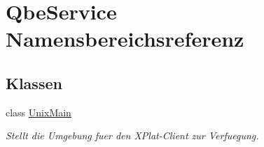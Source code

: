\hypertarget{namespaceQbeService}{
\section{Qbe\-Service Namensbereichsreferenz}
\label{namespaceQbeService}
}




\subsection*{Klassen}
\begin{CompactItemize}
\item 
class \hyperlink{classQbeService_1_1UnixMain}{Unix\-Main}
\begin{CompactList}\small\item\em Stellt die Umgebung fuer den XPlat-Client zur Verfuegung. \item\end{CompactList}\end{CompactItemize}
